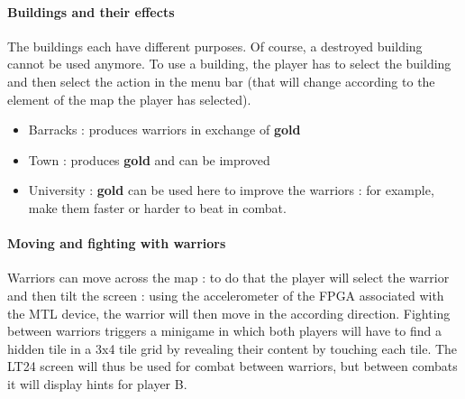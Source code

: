 \documentclass[10pt,a4paper]{article}
\begin{document}
\paragraph{Buildings and their effects}
The buildings each have different purposes. Of course, a destroyed building cannot be used anymore. To use a building, the player has to select the building and then select the action in the menu bar (that will change according to the element of the map the player has selected).

\begin{itemize}
\item Barracks : produces warriors in exchange of \textbf{gold}
\item Town : produces \textbf{gold} and can be improved
\item University : \textbf{gold} can be used here to improve the warriors : for example, make them faster or harder to beat in combat.
\end{itemize}

\paragraph{Moving and fighting with warriors}
Warriors can move across the map : to do that the player will select the warrior and then tilt the screen : using the accelerometer of the FPGA associated with the MTL device, the warrior will then move in the according direction. Fighting between warriors triggers a minigame in which both players will have to find a hidden tile in a 3x4 tile grid by revealing their content by touching each tile. The LT24 screen will thus be used for combat between warriors, but between combats it will display hints for player B.
\end{document}
